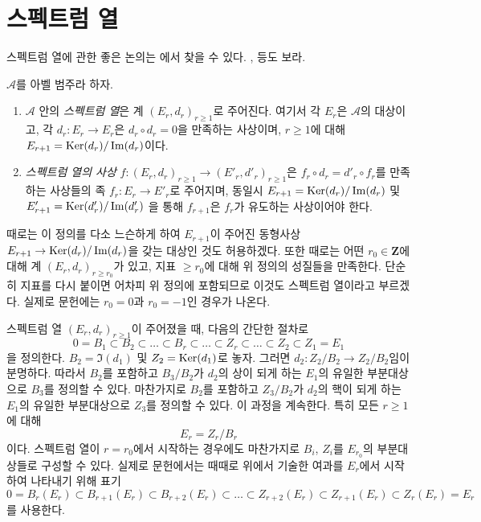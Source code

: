 \section{스펙트럼 열}
\label{section-spectral-sequence}

\noindent
스펙트럼 열에 관한 좋은 논의는 \cite{Eisenbud}에서 찾을 수 있다.
\cite{McCleary}, \cite{Lang} 등도 보라.

\begin{definition}
\label{definition-spectral-sequence}
$\mathcal{A}$를 아벨 범주라 하자.
\begin{enumerate}
\item $\mathcal{A}$ 안의 {\it 스펙트럼 열}은 계
$(E_r, d_r)_{r \geq 1}$로 주어진다. 여기서 각 $E_r$은
$\mathcal{A}$의 대상이고, 각 $d_r : E_r \to E_r$은
$d_r \circ d_r = 0$을 만족하는 사상이며, $r \geq 1$에 대해
$E_{r + 1} = \mathop{\mathrm{Ker}}(d_r)/\mathop{\mathrm{Im}}(d_r)$이다.
\item {\it 스펙트럼 열의 사상}
$f : (E_r, d_r)_{r \geq 1} \to (E'_r, d'_r)_{r \geq 1}$은
$f_r \circ d_r = d'_r \circ f_r$를 만족하는 사상들의 족
$f_r : E_r \to E'_r$로 주어지며, 동일시
$E_{r + 1} = \mathop{\mathrm{Ker}}(d_r)/\mathop{\mathrm{Im}}(d_r)$
및
$E'_{r + 1} = \mathop{\mathrm{Ker}}(d'_r)/\mathop{\mathrm{Im}}(d'_r)$
을 통해 $f_{r + 1}$은 $f_r$가 유도하는 사상이어야 한다.
\end{enumerate}
\end{definition}

\noindent
때로는 이 정의를 다소 느슨하게 하여 $E_{r + 1}$이 주어진 동형사상
$E_{r + 1} \to \mathop{\mathrm{Ker}}(d_r)/\mathop{\mathrm{Im}}(d_r)$을 갖는 대상인 것도 허용하겠다.
또한 때로는 어떤 $r_0 \in \mathbf{Z}$에 대해 계
$(E_r, d_r)_{r \geq r_0}$가 있고, 지표 $\geq r_0$에 대해 위 정의의
성질들을 만족한다. 단순히 지표를 다시 붙이면 어차피 위 정의에
포함되므로 이것도 스펙트럼 열이라고 부르겠다. 실제로 문헌에는
$r_0 = 0$과 $r_0 = -1$인 경우가 나온다.

\medskip\noindent
스펙트럼 열 $(E_r, d_r)_{r \geq 1}$이 주어졌을 때, 다음의 간단한
절차로
$$
0 = B_1 \subset B_2 \subset \ldots \subset B_r \subset \ldots
\subset Z_r \subset \ldots \subset Z_2 \subset Z_1 = E_1
$$
을 정의한다. $B_2 = \Im(d_1)$ 및 $Z_2 = \mathop{\mathrm{Ker}}(d_1)$로 놓자.
그러면 $d_2 : Z_2/B_2 \to Z_2/B_2$임이 분명하다. 따라서
$B_2$를 포함하고 $B_3/B_2$가 $d_2$의 상이 되게 하는 $E_1$의 유일한
부분대상으로 $B_3$를 정의할 수 있다. 마찬가지로 $B_2$를 포함하고
$Z_3/B_2$가 $d_2$의 핵이 되게 하는 $E_1$의 유일한 부분대상으로
$Z_3$를 정의할 수 있다. 이 과정을 계속한다. 특히 모든
$r \geq 1$에 대해
$$
E_r = Z_r/B_r
$$
이다. 스펙트럼 열이 $r = r_0$에서 시작하는 경우에도 마찬가지로
$B_i$, $Z_i$를 $E_{r_0}$의 부분대상들로 구성할 수 있다. 실제로
문헌에서는 때때로 위에서 기술한 여과를 $E_r$에서 시작하여 나타내기
위해 표기
$$
0 = B_r(E_r) \subset B_{r + 1}(E_r) \subset B_{r + 2}(E_r) \subset \ldots
\subset Z_{r + 2}(E_r) \subset Z_{r + 1}(E_r) \subset Z_r(E_r) = E_r
$$
를 사용한다.

